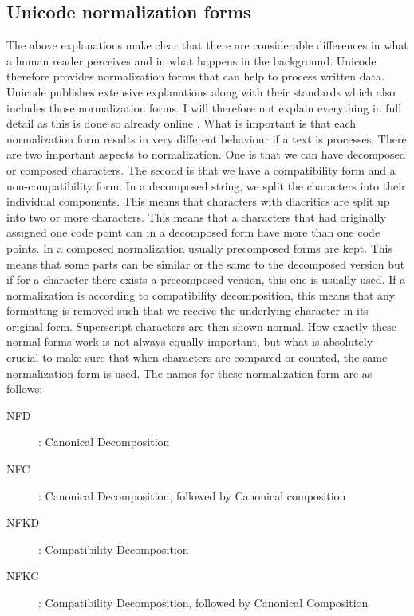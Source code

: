 \subsection{Unicode normalization forms}
The above explanations make clear that there are considerable differences in what a human reader perceives and in what happens in the background. Unicode therefore provides normalization forms that can help to process written data.  Unicode publishes extensive explanations along with their standards which also includes those normalization forms. I will therefore not explain everything in full detail as this is done so already online \citep{Unicode.27.08.2021}. What is important is that each normalization form results in very different behaviour if a text is processes. There are two important aspects to normalization. One is that we can have decomposed or composed characters. The second is that we have a compatibility form and a non-compatibility form. In a decomposed string, we split the characters into their individual components. This means that characters with diacritics are split up into two or more characters. This means that a characters that had originally assigned one code point can in a decomposed form have more than one code points. In a composed normalization usually precomposed forms are kept. This means that some parts can be similar or the same to the decomposed version but if for a character there exists a precomposed version, this one is usually used. If a normalization is according to compatibility decomposition, this means that any formatting is removed such that we receive the underlying character in its original form. Superscript characters are then shown normal. How exactly these normal forms work is not always equally important, but what is absolutely crucial to make sure that when characters are compared or counted, the same normalization form is used.  The names for these normalization form are as follows:

\begin{description}
\item[NFD] : Canonical Decomposition
\item[NFC] : Canonical Decomposition, followed by Canonical composition
\item[NFKD] : Compatibility Decomposition
\item[NFKC] : Compatibility Decomposition, followed by Canonical Composition
\end{description}





